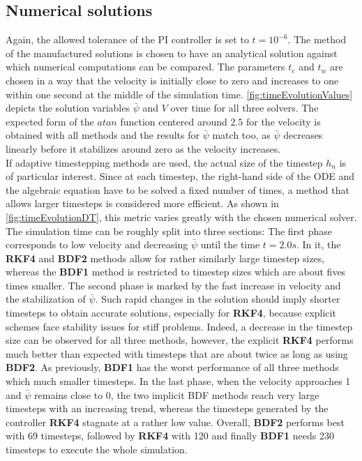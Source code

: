 \subsection{Numerical solutions}
Again, the allowed tolerance of the PI controller is set to $t=10^{-6}$. The method of the manufactured solutions is chosen to have an analytical solution against which numerical computations can be compared. The parameters $t_e$ and $t_w$ are chosen in a way that the velocity is initially close to zero and increases to one within one second at the middle of the simulation time. \autoref{fig:timeEvolutionValues} depicts the solution variables $\bar{\psi}$ and $V$ over time for all three solvers. The expected form of the $atan$ function centered around $2.5$ for the velocity is obtained with all methods and the results for $\bar{\psi}$ match too, as $\bar{\psi}$ decreases linearly before it stabilizes around zero as the velocity increases. \\
If adaptive timestepping methods are used, the actual size of the timestep $h_n$ is of particular interest. Since at each timestep, the right-hand side of the ODE and the algebraic equation have to be solved a fixed number of times, a method that allows larger timesteps is considered more efficient. As shown in \autoref{fig:timeEvolutionDT}, this metric varies greatly with the chosen numerical solver. The simulation time can be roughly split into three sections: The first phase corresponds to low velocity and decreasing $\bar{\psi}$ until the time $t=2.0s$. In it, the \textbf{RKF4} and \textbf{BDF2} methods allow for rather similarly large timestep sizes, whereas the \textbf{BDF1} method is restricted to timestep sizes which are about fives times smaller. The second phase is marked by the fast increase in velocity and the stabilization of $\bar{\psi}$. Such rapid changes in the solution should imply shorter timesteps to obtain accurate solutions, especially for \textbf{RKF4}, because explicit schemes face stability issues for stiff problems. Indeed, a decrease in the timestep size can be observed for all three methods, however, the explicit \textbf{RKF4} performs much better than expected with timesteps that are about twice as long as using \textbf{BDF2}. As previously, \textbf{BDF1} has the worst performance of all three methods which much smaller timesteps. In the last phase, when the velocity approaches 1 and $\bar{\psi}$ remains close to 0, the two implicit BDF methods reach very large timesteps with an increasing trend, whereas the timesteps generated by the controller \textbf{RKF4} stagnate at a rather low value. Overall, \textbf{BDF2} performs best with 69 timesteps, followed by \textbf{RKF4} with 120 and finally \textbf{BDF1} needs 230 timesteps to execute the whole simulation. 


